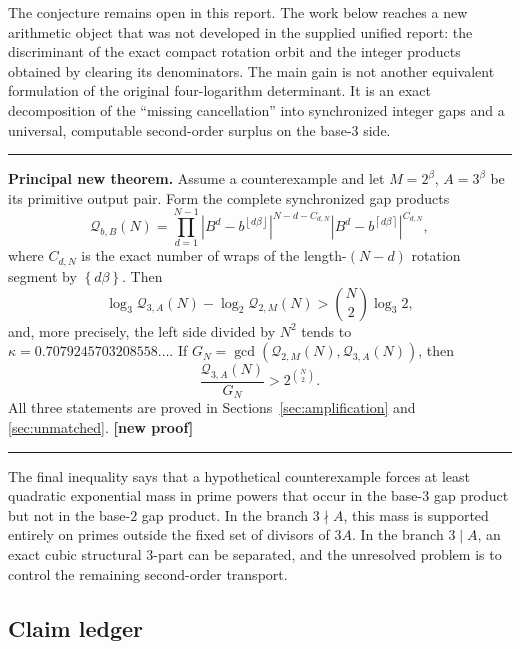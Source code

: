 \documentclass[11pt,oneside]{article}
\theoremstyle{definition}
\theoremstyle{remark}
\newcommand{\floor}[1]{\left\lfloor #1\right\rfloor}
\newcommand{\ceil}[1]{\left\lceil #1\right\rceil}
\newcommand{\fract}[1]{\left\{#1\right\}}
\newcommand{\statusnew}{\textcolor{deepgreen}{\textbf{[new proof]}}}
\newenvironment{resultbox}
  {\begin{center}\begin{minipage}{0.93\textwidth}\hrule\vspace{0.65em}}
  {\vspace{0.45em}\hrule\end{minipage}\end{center}}
\begin{document}
The conjecture remains open in this report.  The work below reaches a new arithmetic object
that was not developed in the supplied unified report: the discriminant of the exact compact
rotation orbit and the integer products obtained by clearing its denominators.  The main gain
is not another equivalent formulation of the original four-logarithm determinant.  It is an
exact decomposition of the ``missing cancellation'' into synchronized integer gaps and a
universal, computable second-order surplus on the base-$3$ side.

\begin{resultbox}
\textbf{Principal new theorem.}  Assume a counterexample and let $M=2^\beta$, $A=3^\beta$ be
its primitive output pair.  Form the complete synchronized gap products
\[
 \mathcal Q_{b,B}(N)=
 \prod_{d=1}^{N-1}
 |B^d-b^{\floor{d\beta}}|^{N-d-C_{d,N}}
 |B^d-b^{\ceil{d\beta}}|^{C_{d,N}},
\]
where $C_{d,N}$ is the exact number of wraps of the length-$(N-d)$ rotation segment by
$\fract{d\beta}$.  Then
\[
 \log_3\mathcal Q_{3,A}(N)
 -\log_2\mathcal Q_{2,M}(N)
 >\binom N2\log_3 2,
\]
and, more precisely, the left side divided by $N^2$ tends to
$\kappa=0.7079245703208558\ldots$.  If
$G_N=\gcd(\mathcal Q_{2,M}(N),\mathcal Q_{3,A}(N))$, then
\[
 \frac{\mathcal Q_{3,A}(N)}{G_N}>2^{\binom N2}.
\]
All three statements are proved in Sections~\ref{sec:amplification} and
\ref{sec:unmatched}.  \statusnew
\end{resultbox}

The final inequality says that a hypothetical counterexample forces at least quadratic
exponential mass in prime powers that occur in the base-$3$ gap product but not in the
base-$2$ gap product.  In the branch $3\nmid A$, this mass is supported entirely on primes
outside the fixed set of divisors of $3A$.  In the branch $3\mid A$, an exact cubic structural
$3$-part can be separated, and the unresolved problem is to control the remaining second-order
transport.

\subsection{Claim ledger}
\end{document}

